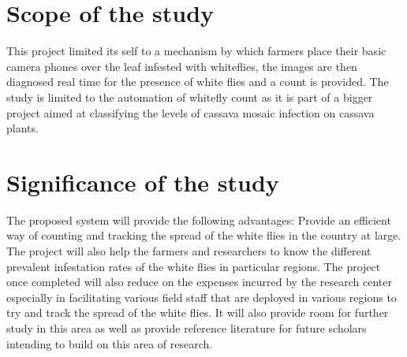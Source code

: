 \section{Scope of the study}
This project limited its self to a mechanism by which farmers place their basic camera phones over the leaf infested with whiteflies, the images are then diagnosed real time for the presence of white flies and a count is provided.  The study is limited to the automation of whitefly count as it is part of a bigger project aimed at classifying the levels of cassava mosaic infection on cassava plants.

\section{Significance of the study}
The proposed system will provide the following advantages:
Provide an efficient way of counting and tracking the spread of the white flies in the country at large.
The project will also help the farmers and researchers to know the different prevalent infestation rates of the white flies in particular regions.
The project once completed will also reduce on the expenses incurred by the research center especially in facilitating various field staff that are deployed in various regions to try and track the spread of the white flies.
It will also provide room for further study in this area as well as provide reference literature for future scholars intending to build on this area of research.